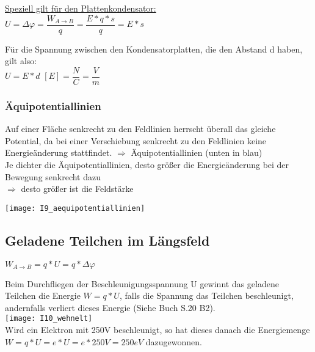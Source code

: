 \vspace{5mm}
\underline{Speziell gilt für den Plattenkondensator:} \\
\vspace{2mm}
$ U = \Delta  \varphi = \dfrac{W_{A \rightarrow B}}{q} = \dfrac{E \ast q \ast s}{q} = E \ast s $

\vspace{2mm}
Für die Spannung zwischen den Kondensatorplatten, die den Abstand d haben, gilt also: \\
\vspace{2mm}
$ U = E \ast d $ \hspace{10mm} $ [E] = \dfrac{N}{C} = \dfrac{V}{m} $
\newpage
\subsubsection{Äquipotentiallinien}
Auf einer Fläche senkrecht zu den Feldlinien herrscht überall das gleiche Potential, da bei einer Verschiebung senkrecht zu den Feldlinien keine Energieänderung stattfindet. $\Rightarrow$ Äquipotentiallinien (unten in blau) \\
\vspace{3mm}
Je dichter die Äquipotentiallinien, desto größer die Energieänderung bei der Bewegung senkrecht dazu \\ $\Rightarrow$ desto größer ist die Feldstärke
\vspace{2mm}

\texttt{[image: I9\_aequipotentiallinien]}
\vspace{10mm}

\subsection{Geladene Teilchen im Längsfeld}
$ W_{A \rightarrow B} = q \ast U = q \ast \Delta \varphi $

\vspace{2mm}
Beim Durchfliegen der Beschleunigungsspannung U gewinnt das geladene Teilchen die Energie $ W = q \ast U $, falls die Spannung das Teilchen beschleunigt, andernfalls verliert dieses Energie (Siehe Buch S.20 B2).
\vspace{2mm} \\
\texttt{[image: I10\_wehnelt]}
\vspace{2mm} \\
Wird ein Elektron mit 250V beschleunigt, so hat dieses danach die Energiemenge $ W = q \ast U = e \ast U = e \ast 250V = 250 eV $ dazugewonnen.


